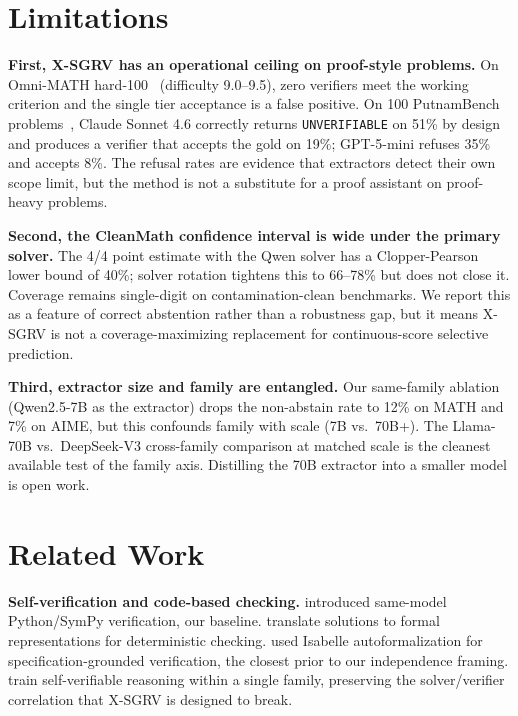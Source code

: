 \documentclass{article}
\begin{document}
\section{Limitations}

\textbf{First, X-SGRV has an operational ceiling on proof-style problems.} On Omni-MATH hard-100~\citep{omnimath2024} (difficulty 9.0--9.5), zero verifiers meet the working criterion and the single tier acceptance is a false positive. On 100 PutnamBench problems~\citep{amitayusht2024putnambench}, Claude Sonnet 4.6 correctly returns \texttt{UNVERIFIABLE} on 51\% by design and produces a verifier that accepts the gold on 19\%; GPT-5-mini refuses 35\% and accepts 8\%. The refusal rates are evidence that extractors detect their own scope limit, but the method is not a substitute for a proof assistant on proof-heavy problems.

\textbf{Second, the CleanMath confidence interval is wide under the primary solver.} The 4/4 point estimate with the Qwen solver has a Clopper-Pearson lower bound of 40\%; solver rotation tightens this to 66--78\% but does not close it. Coverage remains single-digit on contamination-clean benchmarks. We report this as a feature of correct abstention rather than a robustness gap, but it means X-SGRV is not a coverage-maximizing replacement for continuous-score selective prediction.

\textbf{Third, extractor size and family are entangled.} Our same-family ablation (Qwen2.5-7B as the extractor) drops the non-abstain rate to 12\% on MATH and 7\% on AIME, but this confounds family with scale (7B vs.\ 70B+). The Llama-70B vs.\ DeepSeek-V3 cross-family comparison at matched scale is the cleanest available test of the family axis. Distilling the 70B extractor into a smaller model is open work.

\section{Related Work}

\textbf{Self-verification and code-based checking.} \citet{exever} introduced same-model Python/SymPy verification, our baseline. \citet{symcode2024, mathvf2025} translate solutions to formal representations for deterministic checking. \citet{dtv2024} used Isabelle autoformalization for specification-grounded verification, the closest prior to our independence framing. \citet{deepseekmathv2} train self-verifiable reasoning within a single family, preserving the solver/verifier correlation that X-SGRV is designed to break.
\end{document}
